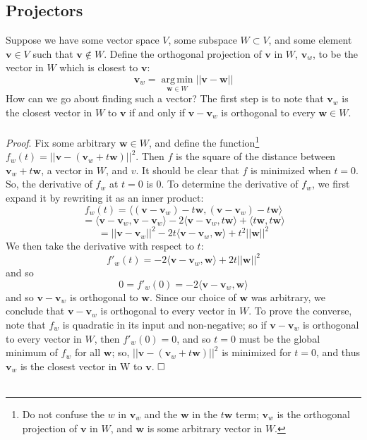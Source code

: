 \documentclass{article}
\newcommand{\la}{\langle}
\newcommand{\ra}{\rangle}
\newcommand{\tit}{\textit}
\DeclareMathOperator*{\argmin}{arg\,min}
\begin{document}
\subsection*{Projectors}
Suppose we have some vector space $V$, some subspace $W \subset V$, and some element $\mathbf{v} \in V$ such that $\mathbf{v} \notin W$. Define the orthogonal projection of $\mathbf{v}$ in $W$, $\mathbf{v}_w$, to be the vector in $W$ which is closest to $\mathbf{v}$: $$\mathbf{v}_w = \argmin\limits_{\mathbf{w} \in W} ||\mathbf{v} - \mathbf{w}||$$ How can we go about finding such a vector? The first step is to note that $\mathbf{v}_w$ is the closest vector in $W$ to $\mathbf{v}$ if and only if $\mathbf{v} - \mathbf{v}_w$ is orthogonal to every $\mathbf{w} \in W$. \\\\
\tit{Proof}. Fix some arbitrary $\mathbf{w} \in W$, and define the function\footnote{Do not confuse the $w$ in $\mathbf{v}_w$ and the $\mathbf{w}$ in the $t\mathbf{w}$ term; $\mathbf{v}_w$ is the orthogonal projection of $\mathbf{v}$ in $W$, and $\mathbf{w}$ is some arbitrary vector in $W$.} $f_w(t) = ||\mathbf{v} - (\mathbf{v}_w + t\mathbf{w})||^2$. Then $f$ is the square of the distance between $\mathbf{v}_w + t\mathbf{w}$, a vector in $W$, and $v$. It should be clear that $f$ is minimized when $t = 0$. So, the derivative of $f_w$ at $t = 0$ is 0. To determine the derivative of $f_w$, we first expand it by rewriting it as an inner product: $$f_w(t) = \la (\mathbf{v} - \mathbf{v}_w) - t\mathbf{w}, (\mathbf{v} - \mathbf{v}_w) - t\mathbf{w} \ra$$ $$= \la \mathbf{v} - \mathbf{v}_w, \mathbf{v} - \mathbf{v}_w \ra - 2\la \mathbf{v} - \mathbf{v}_w, t\mathbf{w} \ra + \la t\mathbf{w}, t\mathbf{w}\ra $$ $$= ||\mathbf{v} - \mathbf{v}_w||^2 - 2t\la \mathbf{v} - \mathbf{v}_w, \mathbf{w}\ra + t^2||\mathbf{w}||^2$$ We then take the derivative with respect to $t$: $$f'_w(t) = -2\la \mathbf{v} - \mathbf{v}_w, \mathbf{w}\ra + 2t||\mathbf{w}||^2$$ and so $$0 = f'_w(0) = -2\la \mathbf{v} - \mathbf{v}_w, \mathbf{w} \ra$$ and so $\mathbf{v} - \mathbf{v}_w$ is orthogonal to $\mathbf{w}$. Since our choice of $\mathbf{w}$ was arbitrary, we conclude that $\mathbf{v} - \mathbf{v}_w$ is orthogonal to every vector in $W$. To prove the converse, note that $f_w$ is quadratic in its input and non-negative; so if $\mathbf{v} - \mathbf{v}_w$ is orthogonal to every vector in $W$, then $f'_w(0) = 0$, and so $t = 0$ must be the global minimum of $f_w$ for all $\mathbf{w}$; so, $||\mathbf{v} - (\mathbf{v}_w + t\mathbf{w})||^2$ is minimized for $t = 0$, and thus $\mathbf{v}_w$ is the closest vector in W to $\mathbf{v}$. $\hfill\square$ \\\\
\end{document}
